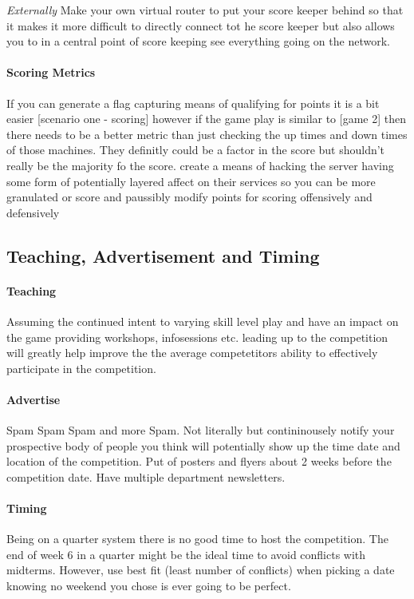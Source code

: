 \documentclass[10pt]{article}
\begin{document}
\textit{Externally}
Make your own virtual router to put your score keeper behind so that it makes it
more difficult to directly connect tot he score keeper but also allows you to in a central
point of score keeping see everything going on the network.

\paragraph{Scoring Metrics}
If you can generate a flag capturing means of qualifying for points it is a bit easier
[scenario one - scoring] however if the game play is similar to [game 2] then there
needs to be a better metric than just checking the up times and down times of those machines.
They definitly could be a factor in the score but shouldn't really be the majority fo the score.
create a means of hacking the server having some form of potentially layered affect on their
services so you can be more granulated or score and paussibly modify points for scoring
offensively and defensively

\subsection{Teaching, Advertisement and Timing}

\paragraph{Teaching}
Assuming the continued intent to varying skill level play and have an impact on the game
providing workshops, infosessions etc. leading up to the competition will greatly help 
improve the the average competetitors ability to effectively participate in the competition.

\paragraph{Advertise}
Spam Spam Spam and more Spam. Not literally but contininousely notify your prospective body
of people you think will potentially show up the time date and location of the competition.
Put of posters and flyers about 2 weeks before the competition date. Have  multiple
department newsletters.

\paragraph{Timing}
Being on a quarter system there is no good time to host the competition. The end of week 6 
in a quarter might be the ideal time to avoid conflicts with midterms. However, 
use best fit (least number of conflicts) when picking a date knowing no weekend you chose is ever going to be perfect.
\end{document}
